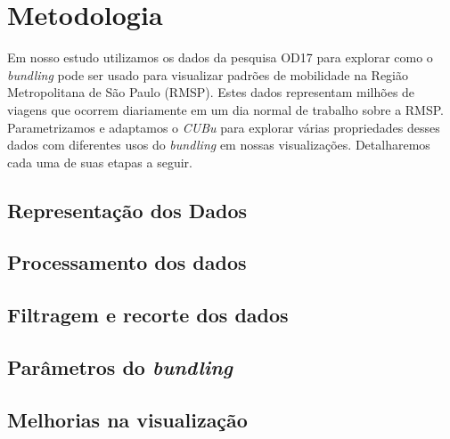 \chapter{Metodologia}
\label{cap:metodologia}
Em nosso estudo utilizamos os dados da pesquisa OD17 para explorar como o
\emph{bundling} pode ser usado para visualizar padrões de mobilidade na Região
Metropolitana de São Paulo (RMSP). Estes dados representam milhões de viagens
que ocorrem diariamente em um dia normal de trabalho sobre a RMSP.
Parametrizamos e adaptamos o \emph{CUBu} para explorar várias propriedades
desses dados com diferentes usos do \emph{bundling} em nossas visualizações.
Detalharemos cada uma de suas etapas a seguir.

\section{Representação dos Dados}

\section{Processamento dos dados}

\section{Filtragem e recorte dos dados}

\section{Parâmetros do \emph{bundling}}
  
\section{Melhorias na visualização}

